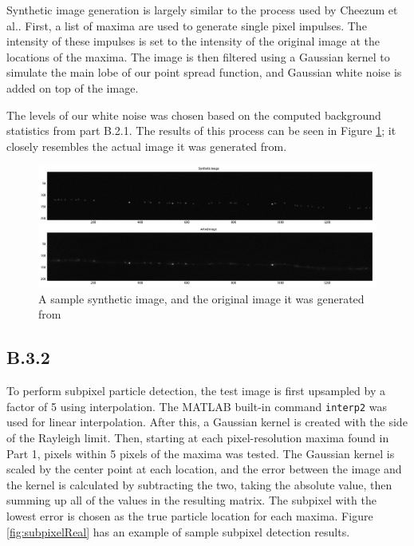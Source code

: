 \documentclass{article}
\begin{document}
Synthetic image generation is largely similar to the process used by Cheezum et al.\cite{cheezum}. First, a list of maxima are used to generate single pixel impulses. The intensity of these impulses is set to the intensity of the original image at the locations of the maxima. The image is then filtered using a Gaussian kernel to simulate the main lobe of our point spread function, and Gaussian white noise is added on top of the image.

The levels of our white noise was chosen based on the computed background statistics from part B.2.1. The results of this process can be seen in Figure \ref{fig:syntheticImage}; it closely resembles the actual image it was generated from.

\begin{figure}[H]
\centering
\includegraphics[width=16cm]{figures/synthetic_image.png}
\caption{A sample synthetic image, and the original image it was generated from}
\label{fig:syntheticImage}
\end{figure}


\subsection*{B.3.2}

To perform subpixel particle detection, the test image is first upsampled by a factor of 5 using interpolation. The MATLAB built-in command \texttt{interp2} was used for linear interpolation. After this, a Gaussian kernel is created with the side of the Rayleigh limit. Then, starting at each pixel-resolution maxima found in Part 1, pixels within 5 pixels of the maxima was tested. The Gaussian kernel is scaled by the center point at each location, and the error between the image and the kernel is calculated by subtracting the two, taking the absolute value, then summing up all of the values in the resulting matrix. The subpixel with the lowest error is chosen as the true particle location for each maxima. Figure \ref{fig:subpixelReal} has an example of sample subpixel detection results.
\end{document}
